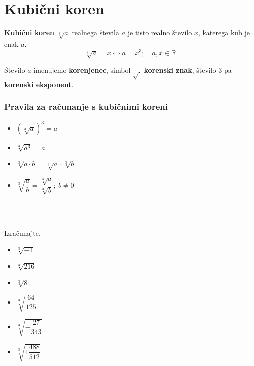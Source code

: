         \newpage
    \section{Kubični koren}

        

            
                \textbf{Kubični koren} $\sqrt[3]{a}$ realnega števila $a$ je tisto realno število $x$,
                katerega kub je enak $a$.
                $$\sqrt[3]{a}=x \Leftrightarrow a=x^3; \quad a,x\in\mathbb{R}$$

                Število $a$ imenujemo \textbf{korenjenec}, simbol $\sqrt{~}$ \textbf{korenski znak}, število $3$ pa \textbf{korenski eksponent}.
            

            \subsubsection*{Pravila za računanje s kubičnimi koreni}
                
                    \begin{itemize}
                        \item $\left(\sqrt[3]{a}\right)^3=a$
                        \item $\sqrt[3]{a^3}=a$
                        \item $\sqrt[3]{a\cdot b}=\sqrt[3]{a}\cdot\sqrt[3]{b}$
                        \item $\sqrt[3]{\dfrac{a}{b}}=\dfrac{\sqrt[3]{a}}{\sqrt[3]{b}}; ~b\neq 0$
                    \end{itemize}
                
            

                    ~~\\~~


        
            \begin{naloga}
                Izračunajte.
                \begin{itemize}
                    
                        \item $\sqrt[3]{-1}$ 
                        \item $\sqrt[3]{216}$ 
                        \item $\sqrt[3]{8}$ 
                        \item $\sqrt[3]{\dfrac{64}{125}}$ 
                        \item $\sqrt[3]{-\dfrac{27}{343}}$ 
                        \item $\sqrt[3]{1\dfrac{488}{512}}$ 
                    

                \end{itemize}
            \end{naloga}
        


